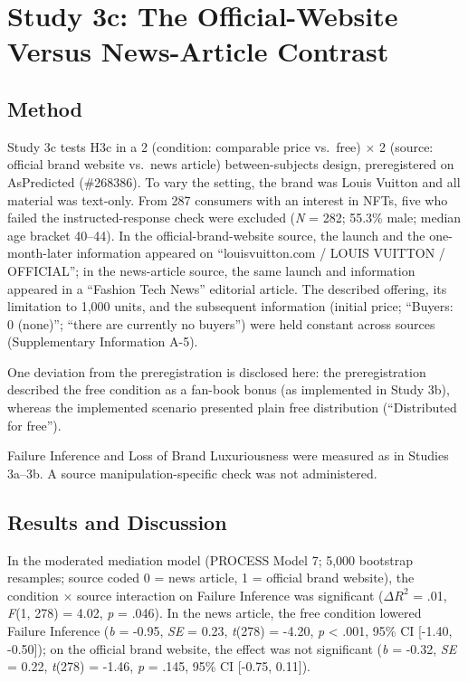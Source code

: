 \documentclass[12pt, a4paper]{article}
\begin{document}
\section{Study 3c: The Official-Website Versus News-Article Contrast}

\subsection{Method}

Study 3c tests H3c in a 2 (condition: comparable price vs.\ free) $\times$ 2 (source: official brand website vs.\ news article) between-subjects design, preregistered on AsPredicted (\#268386). To vary the setting, the brand was Louis Vuitton and all material was text-only. From 287 consumers with an interest in NFTs, five who failed the instructed-response check were excluded (\emph{N} = 282; 55.3\% male; median age bracket 40--44). In the official-brand-website source, the launch and the one-month-later information appeared on ``louisvuitton.com / LOUIS VUITTON / OFFICIAL''; in the news-article source, the same launch and information appeared in a ``Fashion Tech News'' editorial article. The described offering, its limitation to 1,000 units, and the subsequent information (initial price; ``Buyers: 0 (none)''; ``there are currently no buyers'') were held constant across sources (Supplementary Information A-5).

One deviation from the preregistration is disclosed here: the preregistration described the free condition as a fan-book bonus (as implemented in Study 3b), whereas the implemented scenario presented plain free distribution (``Distributed for free'').

Failure Inference and Loss of Brand Luxuriousness were measured as in Studies 3a--3b. A source manipulation-specific check was not administered.

\subsection{Results and Discussion}

In the moderated mediation model (PROCESS Model 7; 5,000 bootstrap resamples; source coded 0 = news article, 1 = official brand website), the condition $\times$ source interaction on Failure Inference was significant ($\Delta R^2$ = .01, \emph{F}(1, 278) = 4.02, \emph{p} = .046). In the news article, the free condition lowered Failure Inference (\emph{b} = -0.95, \emph{SE} = 0.23, \emph{t}(278) = -4.20, \emph{p} \textless{} .001, 95\% CI {[}-1.40, -0.50{]}); on the official brand website, the effect was not significant (\emph{b} = -0.32, \emph{SE} = 0.22, \emph{t}(278) = -1.46, \emph{p} = .145, 95\% CI {[}-0.75, 0.11{]}).
\end{document}
